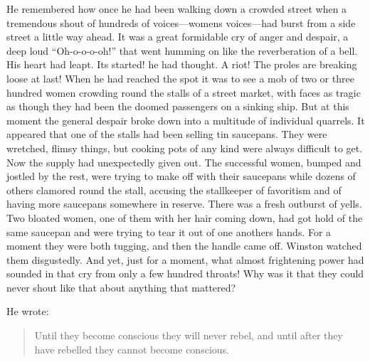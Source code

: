 He remembered how once he had been walking down a crowded street when a
tremendous shout of hundreds of voices---women\textquotesingle s
voices---had burst from a side street a little way ahead. It was a great
formidable cry of anger and despair, a deep loud ``Oh-o-o-o-oh!'' that
went humming on like the reverberation of a bell. His heart had leapt.
It\textquotesingle s started! he had thought. A riot! The proles are
breaking loose at last! When he had reached the spot it was to see a mob
of two or three hundred women crowding round the stalls of a street
market, with faces as tragic as though they had been the doomed
passengers on a sinking ship. But at this moment the general despair
broke down into a multitude of individual quarrels. It appeared that one
of the stalls had been selling tin saucepans. They were wretched, flimsy
things, but cooking pots of any kind were always difficult to get. Now
the supply had unexpectedly given out. The successful women, bumped and
jostled by the rest, were trying to make off with their saucepans while
dozens of others clamored round the stall, accusing the stallkeeper of
favoritism and of having more saucepans somewhere in reserve. There was
a fresh outburst of yells. Two bloated women, one of them with her hair
coming down, had got hold of the same saucepan and were trying to tear
it out of one another\textquotesingle s hands. For a moment they were
both tugging, and then the handle came off. Winston watched them
disgustedly. And yet, just for a moment, what almost frightening power
had sounded in that cry from only a few hundred throats! Why was it that
they could never shout like that about anything that mattered?

He wrote:

\begin{quotation}
Until they become conscious they will never rebel, and until after
they have rebelled they cannot become conscious.
\end{quotation}

